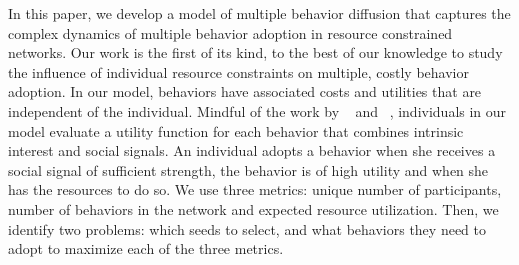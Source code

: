 \documentclass[letterpaper]{article}
\theoremstyle{plain} 		\newtheorem{thm}{Theorem}[section]
\theoremstyle{definition} 	\newtheorem{defn}[thm]{Definition}
\theoremstyle{remark}		\newtheorem{rem}{Remark}
\begin{document}
%
%

In this paper, we develop a model of multiple behavior diffusion that captures the complex dynamics of multiple behavior adoption in resource constrained networks. Our work is the first of its kind, to the best of our knowledge to study the influence of individual resource constraints on multiple, costly behavior adoption. In our model, behaviors have associated costs and utilities that are independent of the individual. Mindful of the work by ~\cite{Aral09} and ~\cite{shalizi11}, individuals in our model evaluate a utility function for each behavior that combines intrinsic interest and social signals.  An individual adopts a behavior when she receives a social signal of sufficient strength, the behavior is of high utility and when she has the resources to do so. We use three metrics: unique number of participants, number of behaviors in the network and expected resource utilization. Then, we identify two problems: which seeds to select, and what behaviors they need to adopt to maximize each of the three metrics.
\end{document}
